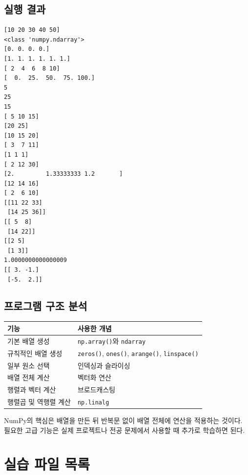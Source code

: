 \documentclass[11pt,a4paper]{article}
\begin{document}
\subsection{실행 결과}

\begin{verbatim}
[10 20 30 40 50]
<class 'numpy.ndarray'>
[0. 0. 0. 0.]
[1. 1. 1. 1. 1. 1.]
[ 2  4  6  8 10]
[  0.  25.  50.  75. 100.]
5
25
15
[ 5 10 15]
[20 25]
[10 15 20]
[ 3  7 11]
[1 1 1]
[ 2 12 30]
[2.         1.33333333 1.2       ]
[12 14 16]
[ 2  6 10]
[[11 22 33]
 [14 25 36]]
[[ 5  8]
 [14 22]]
[[2 5]
 [1 3]]
1.0000000000000009
[[ 3. -1.]
 [-5.  2.]]
\end{verbatim}

\subsection{프로그램 구조 분석}

\begin{center}
\begin{tabular}{ll}
\toprule
기능 & 사용한 개념 \\
\midrule
기본 배열 생성 & \texttt{np.array()}와 \texttt{ndarray} \\
규칙적인 배열 생성 & \texttt{zeros()}, \texttt{ones()}, \texttt{arange()}, \texttt{linspace()} \\
일부 원소 선택 & 인덱싱과 슬라이싱 \\
배열 전체 계산 & 벡터화 연산 \\
행렬과 벡터 계산 & 브로드캐스팅 \\
행렬곱 및 역행렬 계산 & \texttt{np.linalg} \\
\bottomrule
\end{tabular}
\end{center}

\begin{importantbox}
NumPy의 핵심은 배열을 만든 뒤 반복문 없이 배열 전체에 연산을 적용하는 것이다. 필요한 고급 기능은 실제 프로젝트나 전공 문제에서 사용할 때 추가로 학습하면 된다.
\end{importantbox}

\section{실습 파일 목록}
\end{document}
